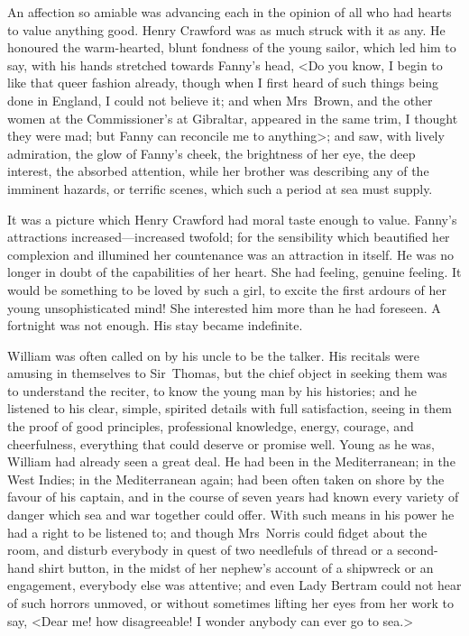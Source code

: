An affection so amiable was advancing each in the opinion of all who had hearts to value anything good. Henry Crawford was as much struck with it as any. He honoured the warm-hearted, blunt fondness of the young sailor, which led him to say, with his hands stretched towards Fanny's head, <Do you know, I begin to like that queer fashion already, though when I first heard of such things being done in England, I could not believe it; and when Mrs~Brown, and the other women at the Commissioner's at Gibraltar, appeared in the same trim, I thought they were mad; but Fanny can reconcile me to anything>; and saw, with lively admiration, the glow of Fanny's cheek, the brightness of her eye, the deep interest, the absorbed attention, while her brother was describing any of the imminent hazards, or terrific scenes, which such a period at sea must supply.

It was a picture which Henry Crawford had moral taste enough to value. Fanny's attractions increased—increased twofold; for the sensibility which beautified her complexion and illumined her countenance was an attraction in itself. He was no longer in doubt of the capabilities of her heart. She had feeling, genuine feeling. It would be something to be loved by such a girl, to excite the first ardours of her young unsophisticated mind! She interested him more than he had foreseen. A fortnight was not enough. His stay became indefinite.

William was often called on by his uncle to be the talker. His recitals were amusing in themselves to Sir~Thomas, but the chief object in seeking them was to understand the reciter, to know the young man by his histories; and he listened to his clear, simple, spirited details with full satisfaction, seeing in them the proof of good principles, professional knowledge, energy, courage, and cheerfulness, everything that could deserve or promise well. Young as he was, William had already seen a great deal. He had been in the Mediterranean; in the West Indies; in the Mediterranean again; had been often taken on shore by the favour of his captain, and in the course of seven years had known every variety of danger which sea and war together could offer. With such means in his power he had a right to be listened to; and though Mrs~Norris could fidget about the room, and disturb everybody in quest of two needlefuls of thread or a second-hand shirt button, in the midst of her nephew's account of a shipwreck or an engagement, everybody else was attentive; and even Lady Bertram could not hear of such horrors unmoved, or without sometimes lifting her eyes from her work to say, <Dear me! how disagreeable! I wonder anybody can ever go to sea.>

